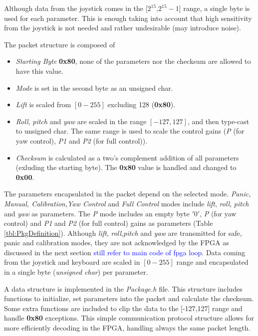 \documentclass{article}
\newcommand\todo[1]{\textcolor{blue}{#1}} %
\begin{document}
Although data from the joystick comes in the [$2^{15}$,$2^{15}-1$] range, a single byte is used for each parameter. This is enough taking into account that high sensitivity from the joystick is not needed and rather undesirable (may introduce noise).

The packet structure is composed of
\begin{itemize}

\item{\emph{Starting Byte} \textbf{0x80}, none of the parameters nor the checksum are allowed to have this value.}

\item{\emph{Mode} is set in the second byte as an unsigned char.}

\item{\emph{Lift} is scaled from $[0-255]$ excluding 128 (\textbf{0x80}).}

\item{\emph{Roll}, \emph{pitch} and \emph{yaw} are scaled in the range $[-127,127]$, and then type-cast to unsigned char. The same range is used to scale the control gains (\emph{P} (for yaw control), \emph{P1} and \emph{P2} (for full control)).}

\item{\emph{Checksum} is calculated as a two's complement addition of all parameters (exluding the starting byte). The \textbf{0x80} value is handled and changed to \textbf{0x00}.}

\end{itemize}

The parameters encapsulated in the packet depend on the selected mode. \emph{Panic, Manual, Calibration,Yaw Control} and \emph{Full Control} modes include \emph{lift}, \emph{roll}, \emph{pitch} and \emph{yaw} as parameters. The \emph{P} mode includes an empty byte $'0'$, \emph{P} (for yaw control) and \emph{P1} and \emph{P2} (for full control) gains as parameters (Table \ref{tbl:PkgDefinition}). Although \emph{lift}, \emph{roll},\emph{pitch} and \emph{yaw} are transmitted for safe, panic and calibration modes, they are not acknowledged by the FPGA as discussed in the next section \todo{still refer to main code of fpga loop}. Data coming from the joystick and keyboard are scaled in $[0-255]$ range and encapsulated in a single byte (\emph{unsigned char}) per parameter.

A data structure is implemented in the \emph{Package.h} file. This structure includes functions to initialize, set parameters into the packet and calculate the checksum. Some extra functions are included to clip the data to the [-127,127] range and handle \textbf{0x80} exceptions. This simple communication protocol structure allows for more efficiently decoding in the FPGA, handling always the same packet length.
\end{document}
